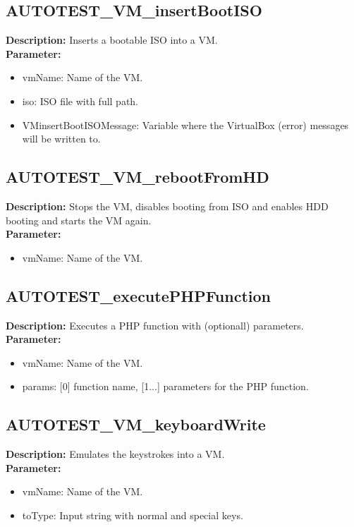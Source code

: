\subsection{AUTOTEST\_VM\_insertBootISO}
\textbf{Description:} Inserts a bootable ISO into a VM.\\
\textbf{Parameter:}
\begin{itemize}
\item vmName: Name of the VM.
\item iso: ISO file with full path.
\item VMinsertBootISOMessage: Variable where the VirtualBox (error) messages will be written to.
\end{itemize}

\subsection{AUTOTEST\_VM\_rebootFromHD}
\textbf{Description:} Stops the VM, disables booting from ISO and enables HDD booting and starts the VM again.\\
\textbf{Parameter:}
\begin{itemize}
\item vmName: Name of the VM.
\end{itemize}

\subsection{AUTOTEST\_executePHPFunction}
\textbf{Description:} Executes a PHP function with (optionall) parameters.\\
\textbf{Parameter:}
\begin{itemize}
\item vmName: Name of the VM.
\item params: [0] function name, [1...] parameters for the PHP function.
\end{itemize}

\subsection{AUTOTEST\_VM\_keyboardWrite}
\textbf{Description:} Emulates the keystrokes into a VM.\\
\textbf{Parameter:}
\begin{itemize}
\item vmName: Name of the VM.
\item toType: Input string with normal and special keys.
\end{itemize}

